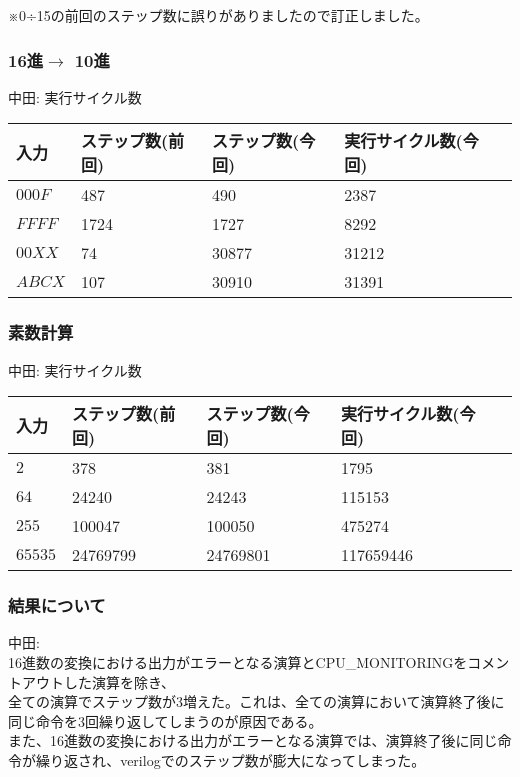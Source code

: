 \documentclass{jsarticle}
\begin{document}
※0÷15の前回のステップ数に誤りがありましたので訂正しました。\\


\subsubsection*{16進$\rightarrow$ 10進}
中田:
実行サイクル数
\begin{table}[h]
  \begin{tabular}{|l|l|l|l|l|} \hline
    入力 & ステップ数(前回) & ステップ数(今回) & 実行サイクル数(今回) \\ \hline
    $000F$ & 487 & 490 & 2387 \\ \hline
    $FFFF$ & 1724 & 1727 & 8292 \\ \hline
    $00XX$ & 74 & 30877 & 31212 \\ \hline
    $ABCX$ & 107 & 30910 & 31391 \\ \hline
  \end{tabular}
\end{table}

\subsubsection*{素数計算}
中田:
実行サイクル数
\begin{table}[h]
  \begin{tabular}{|l|l|l|l|l|} \hline
    入力 & ステップ数(前回) & ステップ数(今回) & 実行サイクル数(今回) \\ \hline
    $2$ & 378 & 381 & 1795 \\ \hline
    $64$ & 24240 & 24243 & 115153 \\ \hline
    $255$ & 100047 & 100050 & 475274 \\ \hline
    $65535$ & 24769799 & 24769801\footnotemark[1] & 117659446 \footnotemark[1] \\ \hline
  \end{tabular}
\end{table}

\subsubsection*{結果について}
中田: \\
16進数の変換における出力がエラーとなる演算とCPU\_MONITORINGをコメントアウトした演算を除き、 \\
全ての演算でステップ数が3増えた。これは、全ての演算において演算終了後に同じ命令を3回繰り返してしまうのが原因である。 \\
また、16進数の変換における出力がエラーとなる演算では、演算終了後に同じ命令が繰り返され、verilogでのステップ数が膨大になってしまった。
\end{document}
